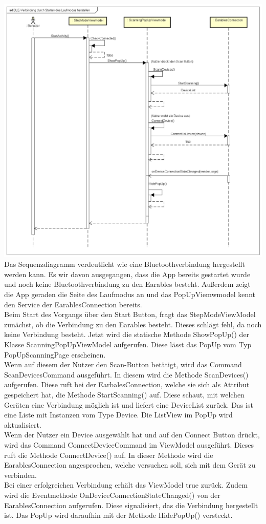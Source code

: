 \documentclass[a4paper,12pt]{article}
\begin{document}
\includegraphics[width=1.1\textwidth]{./Diagramme/Verbindungsaufbausequenzdiagramm.png}\\
Das Sequenzdiagramm verdeutlicht wie eine Bluetoothverbindung hergestellt werden kann. Es wir davon ausgegangen, dass die App bereits gestartet wurde und noch keine Bluetoothverbindung zu den Earables besteht. Außerdem zeigt die App geraden die Seite des Laufmodus an und das PopUpViemwmodel kennt den Service der EarablesConnection bereits.\\
Beim Start des Vorgangs über den Start Button, fragt das StepModeViewModel zunächst, ob die Verbindung zu den \gls{Earables} besteht. Dieses schlägt fehl, da noch keine Verbindung besteht.
Jetzt wird die statische Methode ShowPopUp() der Klasse ScanningPopUpViewModel aufgerufen. Diese lässt das PopUp vom Typ PopUpScanningPage erscheinen.\\
Wenn auf diesem der Nutzer den Scan-Button betätigt, wird das Command ScanDevicesCommand ausgeführt. In diesem wird die Methode ScanDevices() aufgerufen. Diese ruft bei der EarbalesConnection, welche sie sich als Attribut gespeichert hat, die Methode StartScanning() auf. 
Diese schaut, mit welchen Geräten eine Verbindung möglich ist und liefert eine DeviceList zurück. Das ist eine Liste mit Instanzen vom Type Device.
Die ListView im PopUp wird aktualisiert.\\
Wenn der Nutzer ein Device ausgewählt hat und auf den Connect Button drückt, wird das Command ConnectDeviceCommand im ViewModel ausgeführt. Dieses ruft die Methode ConnectDevice() auf. In dieser Methode wird die EarablesConnection angesprochen, welche versuchen soll, sich mit dem Gerät zu verbinden.\\
Bei einer erfolgreichen Verbindung erhält das ViewModel true zurück. Zudem wird die Eventmethode OnDeviceConnectionStateChanged() von der EarablesConnection aufgerufen. Diese signalisiert, das die Verbindung hergestellt ist. Das PopUp wird daraufhin mit der Methode HidePopUp() versteckt.
\end{document}
